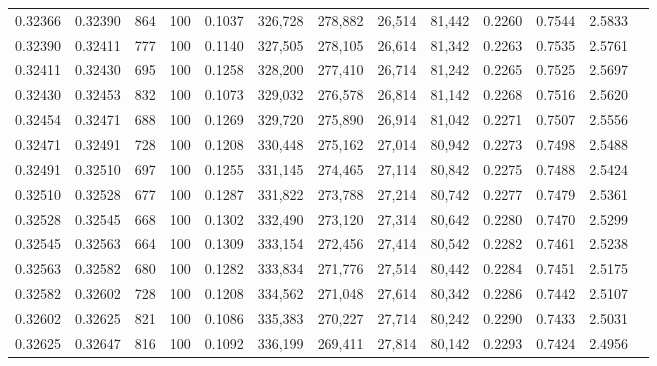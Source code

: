 \begin{tabular}{rrrrrrrrrrrrr}
0.32366 & 0.32390 &   864 & 100 &                                     0.1037 & 326,728 & 278,882 &  26,514 &  81,442 & 0.2260 & 0.7544 & 2.5833 \\
0.32390 & 0.32411 &   777 & 100 &                                     0.1140 & 327,505 & 278,105 &  26,614 &  81,342 & 0.2263 & 0.7535 & 2.5761 \\
0.32411 & 0.32430 &   695 & 100 &                                     0.1258 & 328,200 & 277,410 &  26,714 &  81,242 & 0.2265 & 0.7525 & 2.5697 \\
0.32430 & 0.32453 &   832 & 100 &                                     0.1073 & 329,032 & 276,578 &  26,814 &  81,142 & 0.2268 & 0.7516 & 2.5620 \\
0.32454 & 0.32471 &   688 & 100 &                                     0.1269 & 329,720 & 275,890 &  26,914 &  81,042 & 0.2271 & 0.7507 & 2.5556 \\
0.32471 & 0.32491 &   728 & 100 &                                     0.1208 & 330,448 & 275,162 &  27,014 &  80,942 & 0.2273 & 0.7498 & 2.5488 \\
0.32491 & 0.32510 &   697 & 100 &                                     0.1255 & 331,145 & 274,465 &  27,114 &  80,842 & 0.2275 & 0.7488 & 2.5424 \\
0.32510 & 0.32528 &   677 & 100 &                                     0.1287 & 331,822 & 273,788 &  27,214 &  80,742 & 0.2277 & 0.7479 & 2.5361 \\
0.32528 & 0.32545 &   668 & 100 &                                     0.1302 & 332,490 & 273,120 &  27,314 &  80,642 & 0.2280 & 0.7470 & 2.5299 \\
0.32545 & 0.32563 &   664 & 100 &                                     0.1309 & 333,154 & 272,456 &  27,414 &  80,542 & 0.2282 & 0.7461 & 2.5238 \\
0.32563 & 0.32582 &   680 & 100 &                                     0.1282 & 333,834 & 271,776 &  27,514 &  80,442 & 0.2284 & 0.7451 & 2.5175 \\
0.32582 & 0.32602 &   728 & 100 &                                     0.1208 & 334,562 & 271,048 &  27,614 &  80,342 & 0.2286 & 0.7442 & 2.5107 \\
0.32602 & 0.32625 &   821 & 100 &                                     0.1086 & 335,383 & 270,227 &  27,714 &  80,242 & 0.2290 & 0.7433 & 2.5031 \\
0.32625 & 0.32647 &   816 & 100 &                                     0.1092 & 336,199 & 269,411 &  27,814 &  80,142 & 0.2293 & 0.7424 & 2.4956 \\

\end{tabular}
